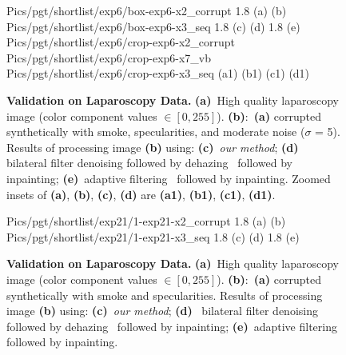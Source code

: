 \begin{figure}[!h]
     {Pics/pgt/shortlist/exp6/box-exp6-x2_corrupt} {1.8} {(a)} {(b)}
     {Pics/pgt/shortlist/exp6/box-exp6-x3_seq} {1.8} {(c)} {(d)}
     {1.8} {(e)}
     {Pics/pgt/shortlist/exp6/crop-exp6-x2_corrupt} {Pics/pgt/shortlist/exp6/crop-exp6-x7_vb} {Pics/pgt/shortlist/exp6/crop-exp6-x3_seq}  {(a1)} {(b1)} {(c1)} {(d1)}
    \caption
    {
        {\bf Validation on Laparoscopy Data. }
        {\bf (a)}~High quality laparoscopy image (color component values $\in [0,255]$).
        {\bf (b)}:~{\bf (a)} corrupted synthetically with smoke, specularities, and moderate noise ($\sigma$ = 5).
        Results of processing image {\bf (b)} using:
        {\bf (c)}~{\em our method};
        {\bf (d)}~ bilateral filter denoising followed by dehazing~\cite{he2011dark} followed by inpainting;
        {\bf (e)}~adaptive filtering~\cite{gibson2013wiener} followed by inpainting.
        Zoomed insets of {\bf (a)}, {\bf (b)}, {\bf (c)}, {\bf (d)} are {\bf (a1)}, {\bf (b1)}, {\bf (c1)}, {\bf (d1)}.
    }
    \label{fig:imagesPgt2}
\end{figure}

\begin{figure}[!h]
     {Pics/pgt/shortlist/exp21/1-exp21-x2_corrupt} {1.8} {(a)} {(b)}
     {Pics/pgt/shortlist/exp21/1-exp21-x3_seq}  {1.8} {(c)} {(d)}
     {1.8} {(e)}
    \caption
    {
        {\bf Validation on Laparoscopy Data. }
        {\bf (a)}~High quality laparoscopy image (color component values $\in [0,255]$).
        {\bf (b)}:~{\bf (a)} corrupted synthetically with smoke and specularities.
        Results of processing image {\bf (b)} using:
        {\bf (c)}~{\em our method};
        {\bf (d)}~ bilateral filter denoising followed by dehazing~\cite{he2011dark} followed by inpainting;
        {\bf (e)}~adaptive filtering~\cite{gibson2013wiener} followed by inpainting.
    }
    \label{fig:imagesPgt3}
\end{figure}

